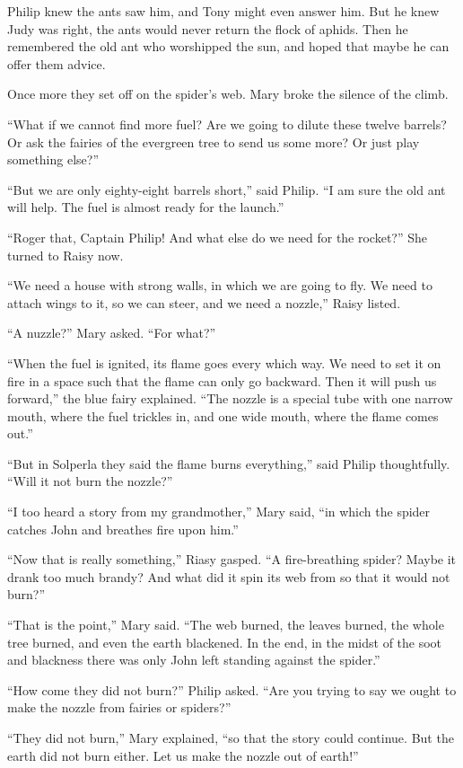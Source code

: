 \documentclass[10pt, draft]{memoir}
\begin{document}
Philip knew the ants saw him, and Tony might even answer him. But he knew Judy
was right, the ants would never return the flock of aphids. Then he remembered
the old ant who worshipped the sun, and hoped that maybe he can offer them
advice.

Once more they set off on the spider's web. Mary broke the silence of the
climb.

``What if we cannot find more fuel? Are we going to dilute these twelve
barrels? Or ask the fairies of the evergreen tree to send us some more? Or just
play something else?''

``But we are only eighty-eight barrels short,'' said Philip. ``I am sure the
old ant will help. The fuel is almost ready for the launch.''

``Roger that, Captain Philip! And what else do we need for the rocket?'' She
turned to Raisy now.

``We need a house with strong walls, in which we are going to fly. We need to
attach wings to it, so we can steer, and we need a nozzle,'' Raisy listed.

``A nuzzle?'' Mary asked. ``For what?''

``When the fuel is ignited, its flame goes every which way. We need to set it
on fire in a space such that the flame can only go backward. Then it will push
us forward,'' the blue fairy explained. ``The nozzle is a special tube with one
narrow mouth, where the fuel trickles in, and one wide mouth, where the flame
comes out.''

``But in Solperla they said the flame burns everything,'' said Philip
thoughtfully. ``Will it not burn the nozzle?''

``I too heard a story from my grandmother,'' Mary said, ``in which the spider
catches John and breathes fire upon him.''

``Now that is really something,'' Riasy gasped. ``A fire-breathing spider?
Maybe it drank too much brandy? And what did it spin its web from so that it
would not burn?''

``That is the point,'' Mary said. ``The web burned, the leaves burned, the
whole tree burned, and even the earth blackened. In the end, in the midst of
the soot and blackness there was only John left standing against the spider.''

``How come they did not burn?'' Philip asked. ``Are you trying to say we ought
to make the nozzle from fairies or spiders?''

``They did not burn,'' Mary explained, ``so that the story could continue. But
the earth did not burn either. Let us make the nozzle out of earth!''
\end{document}
